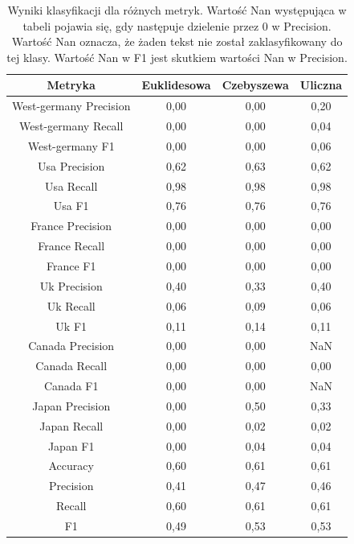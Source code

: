 \documentclass{classrep}
\begin{document}
\newpage
\begin{table}[h!]
\caption{Wyniki klasyfikacji dla różnych metryk. Wartość Nan występująca w tabeli pojawia się, gdy następuje dzielenie przez 0 w Precision. Wartość Nan oznacza, że żaden tekst nie został zaklasyfikowany do tej klasy. Wartość Nan w F1 jest skutkiem wartości Nan w Precision.}
\centering
\vspace{0.1cm}
 \begin{tabular}{c c c c}

    \textbf{Metryka} & \textbf{Euklidesowa}   & \textbf{Czebyszewa}  & \textbf{Uliczna}  \\

\hline
West-germany Precision 	& 0,00 & 0,00 & 0,20 \\
West-germany Recall 		& 0,00 & 0,00 & 0,04 \\
West-germany F1		& 0,00 & 0,00 & 0,06 \\
\hline
Usa Precision 			& 0,62 & 0,63 & 0,62 \\
Usa Recall				& 0,98 & 0,98 & 0,98 \\
Usa F1			 	& 0,76 & 0,76 & 0,76 \\
\hline
France Precision 		& 0,00 & 0,00 & 0,00 \\
France Recall 			& 0,00 & 0,00 & 0,00 \\
France F1 				& 0,00 & 0,00 & 0,00 \\
\hline
Uk Precision 			& 0,40 & 0,33 & 0,40 \\
Uk Recall 				& 0,06 & 0,09 & 0,06 \\
Uk F1 				& 0,11 & 0,14 & 0,11 \\
\hline
Canada Precision		& 0,00 & 0,00 & NaN \\
Canada Recall 			& 0,00 & 0,00 & 0,00 \\
Canada F1 			& 0,00 & 0,00 & NaN \\
\hline
Japan Precision 		& 0,00 & 0,50 & 0,33 \\
Japan Recall 			& 0,00 & 0,02 & 0,02 \\
Japan F1 				& 0,00 & 0,04 & 0,04 \\
\hline
Accuracy 				& 0,60 & 0,61 & 0,61 \\
Precision 				& 0,41 & 0,47 & 0,46 \\
Recall 				& 0,60 & 0,61 & 0,61 \\
F1 					& 0,49 & 0,53 & 0,53 \\

\end {tabular}
\label {Wyniki klasyfikacji dla różnych metryk.}
\end{table}
\end{document}
